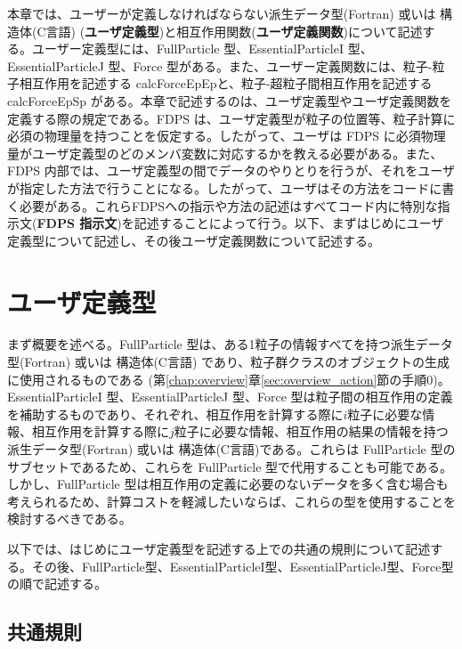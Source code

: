 本章では、ユーザーが定義しなければならない派生データ型(Fortran) 或いは 構造体(C言語) (\textbf{ユーザ定義型})と相互作用関数(\textbf{ユーザ定義関数})について記述する。ユーザー定義型には、FullParticle 型、EssentialParticleI 型、EssentialParticleJ 型、Force 型がある。また、ユーザー定義関数には、粒子-粒子相互作用を記述する calcForceEpEpと、粒子-超粒子間相互作用を記述する calcForceEpSp がある。本章で記述するのは、ユーザ定義型やユーザ定義関数を定義する際の規定である。FDPS は、ユーザ定義型が粒子の位置等、粒子計算に必須の物理量を持つことを仮定する。したがって、ユーザは FDPS に必須物理量がユーザ定義型のどのメンバ変数に対応するかを教える必要がある。また、FDPS 内部では、ユーザ定義型の間でデータのやりとりを行うが、それをユーザが指定した方法で行うことになる。したがって、ユーザはその方法をコードに書く必要がある。これらFDPSへの指示や方法の記述はすべてコード内に特別な指示文(\textbf{FDPS 指示文})を記述することによって行う。以下、まずはじめにユーザ定義型について記述し、その後ユーザ定義関数について記述する。

\section{ユーザ定義型}
\label{sec:user_defined_types}
まず概要を述べる。FullParticle 型は、ある1粒子の情報すべてを持つ派生データ型(Fortran) 或いは 構造体(C言語) であり、粒子群クラスのオブジェクトの生成に使用されるものである (第\ref{chap:overview}章\ref{sec:overview_action}節の手順0)。EssentialParticleI 型、EssentialParticleJ 型、Force 型は粒子間の相互作用の定義を補助するものであり、それぞれ、相互作用を計算する際に$i$粒子に必要な情報、相互作用を計算する際に$j$粒子に必要な情報、相互作用の結果の情報を持つ派生データ型(Fortran) 或いは 構造体(C言語)である。これらは FullParticle 型のサブセットであるため、これらを FullParticle 型で代用することも可能である。しかし、FullParticle 型は相互作用の定義に必要のないデータを多く含む場合も考えられるため、計算コストを軽減したいならば、これらの型を使用することを検討するべきである。

以下では、はじめにユーザ定義型を記述する上での共通の規則について記述する。その後、FullParticle型、EssentialParticleI型、EssentialParticleJ型、Force型の順で記述する。

\subsection{共通規則}
\label{subsec:common_rules_for_user_defined_types}
